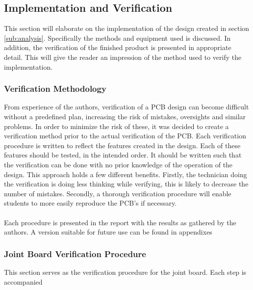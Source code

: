 \subsection{Implementation and Verification} %
\label{sub:implementation_and_verification}
This section will elaborate on the implementation of the design created in section \ref{sub:analysis}.
Specifically the methods and equipment used is discussed.
In addition, the verification of the finished product is presented in appropriate detail.
This will give the reader an impression of the method used to verify the implementation.

\subsubsection{Verification Methodology} %
\label{ssub:testing_methodology}
From experience of the authors, verification of a PCB design can become difficult without a predefined plan, increasing the risk of mistakes, oversights and similar problems.
In order to minimize the risk of these, it was decided to create a verification method prior to the actual verification of the PCB.
Each verification procedure is written to reflect the features created in the design.
Each of these features should be tested, in the intended order.
It should be written such that the verification can be done with no prior knowledge of the operation of the design.
This approach holds a few different benefits.
Firstly, the technician doing the verification is doing less thinking while verifying, this is likely to decrease the number of mistakes.
Secondly, a thorough verification procedure will enable students to more easily reproduce the PCB's if necessary.\\~\\
Each procedure is presented in the report with the results as gathered by the authors.
A version suitable for future use can be found in appendixes 

\subsubsection{Joint Board Verification Procedure} %
\label{ssub:joint_board_verification_methodology}
This section serves as the verification procedure for the joint board.
Each step is accompanied
